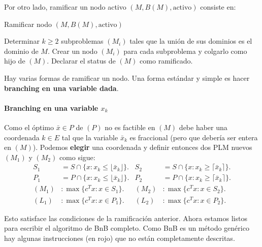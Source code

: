     Por otro lado, ramificar un nodo activo $(M,B(M),\text{activo})$ consiste en:
    \begin{algorithm}[H]
    	\caption{Ramificar nodo $(M,B(M),\text{activo})$}
    	\label{alg:bnb}
    	\begin{algorithmic}[1] 
    		\State Determinar $k\geq 2$ subproblemas $(M_i)$ tales que la unión de sus dominios es el dominio de $M$.
    		\State Crear un nodo $(M_i)$ para cada subproblema y colgarlo como hijo de $(M)$.
    		\State Declarar el status de $(M)$ como ramificado.
    	\end{algorithmic}
    \end{algorithm} 
    
    Hay varias formas de ramificar un nodo. Una forma estándar y simple es hacer \textbf{branching en una variable dada}. 
    
    \paragraph{Branching en una variable $x_k$} Como el óptimo $\bar{x}\in P$ de $(P)$ no es factible en $(M)$ debe haber una coordenada $k\in E$ tal que la variable $\bar{x}_k$ es fraccional (pero que debería ser entera en $(M)$). Podemos \textbf{elegir} una coordenada y definir entonces dos PLM nuevos $(M_1)$ y $(M_2)$ como sigue:
    \begin{align*}
    S_1&=S\cap \{x\colon x_k \leq \lfloor \bar{x}_k \rfloor\}. &S_2&=S\cap \{x\colon x_k \geq \lceil \bar{x}_k \rceil\}.\\
    P_1&= P \cap \{x\colon x_k \leq \lfloor \bar{x}_k \rfloor\}. &P_2&= P \cap \{x\colon x_k \geq \lceil \bar{x}_k \rceil\}.\\
    (M_1)&\colon \max\{c^Tx\colon x\in S_1\}. & (M_2)&\colon \max\{c^Tx\colon x\in S_2\}.\\
    (L_1)&\colon \max\{c^Tx\colon x\in P_1\}. & (L_2)&\colon \max\{c^Tx\colon x\in P_2\}.
    \end{align*}
    
    Esto satisface las condiciones de la ramificación anterior. Ahora estamos listos para escribir el algoritmo de BnB completo. Como BnB es un método genérico hay algunas instrucciones (en rojo) que no están completamente descritas. 
    
